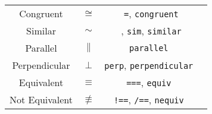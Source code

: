 \documentclass{article}
\begin{document}
\begin{table}[!h]
\begin{tabular}{|c|c|c|l|}
      Congruent & \( \cong \) & \texttt{~=}, \texttt{congruent} & \\
      Similar & \( \sim \) & \texttt{~}, \texttt{sim}, \texttt{similar} & \\
      Parallel & \( \parallel \) & \texttt{parallel} & \\
      Perpendicular & \( \perp \) & \texttt{perp}, \texttt{perpendicular} & \\
      \hline
      Equivalent & \( \equiv \) & \texttt{===}, \texttt{equiv} & \\
      Not Equivalent & \( \not\equiv \) & \texttt{!==}, \texttt{/==}, \texttt{nequiv} & \\
      \hline
    \end{tabular}
  \end{table}

  \newpage
\end{document}
